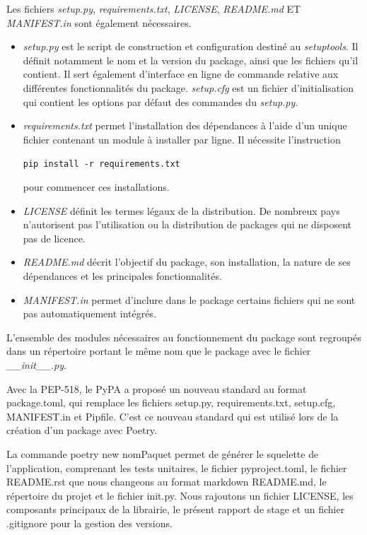 \documentclass[twoside,a4paper,11pt,frenchb,openany]{report}
\begin{document}
Les fichiers \textit{setup.py},  \textit{requirements.txt}, \textit{LICENSE},  \textit{README.md} ET \textit{MANIFEST.in} sont également nécessaires.  
\begin{itemize}
\item \textit{setup.py} est le script de construction et configuration destiné au \textit{setuptools}. Il définit notamment le nom et la version du package, ainsi que les fichiers qu'il contient. Il sert également d'interface en ligne de commande relative aux différentes fonctionnalités du package. \textit{setup.cfg} est un fichier d'initialisation qui contient les options par défaut des commandes du \textit{setup.py}.
\item \textit{requirements.txt} permet l'installation des dépendances à l'aide d'un unique fichier contenant un module à installer par ligne. Il nécessite l'instruction 
\begin{tcolorbox}\texttt{pip install -r requirements.txt}\end{tcolorbox}
pour commencer ces installations.
\item \textit{LICENSE} définit les termes légaux de la distribution. De nombreux pays n'autorisent pas l'utilisation ou la distribution de packages qui ne disposent pas de licence.
\item \textit{README.md} décrit l'objectif du package, son installation, la nature de ses dépendances et les principales fonctionnalités.
\item \textit{MANIFEST.in} permet d'inclure dans le package certains fichiers qui ne sont pas automatiquement intégrés. 
\end{itemize}

L'ensemble des modules nécessaires au fonctionnement du package sont regroupés dans un répertoire portant le même nom que le package avec le fichier \textit{\_\_init\_\_.py}.

Avec la PEP-518, le PyPA a proposé un nouveau standard au format package.toml, qui remplace les fichiers setup.py, requirements.txt, setup.cfg, MANIFEST.in et Pipfile. C'est ce nouveau standard qui est utilisé lors de la création d'un package avec Poetry.

La commande poetry new nomPaquet permet de générer le squelette de l'application, comprenant les tests unitaires, le fichier pyproject.toml, le fichier README.rst que nous changeons au format markdown README.md, le répertoire du projet et le fichier init.py. Nous rajoutons un fichier LICENSE, les composants principaux de la librairie, le présent rapport de stage et un fichier .gitignore pour la gestion des versions.
	
\end{document}
